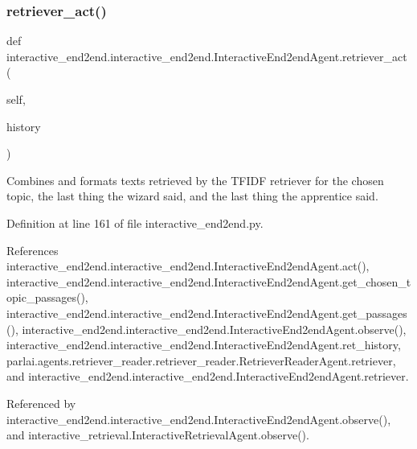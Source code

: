 \subsubsection{\texorpdfstring{retriever\+\_\+act()}{retriever\_act()}}
{\footnotesize\ttfamily def interactive\+\_\+end2end.\+interactive\+\_\+end2end.\+Interactive\+End2end\+Agent.\+retriever\+\_\+act (\begin{DoxyParamCaption}\item[{}]{self,  }\item[{}]{history }\end{DoxyParamCaption})}

\begin{DoxyVerb}Combines and formats texts retrieved by the TFIDF retriever for the
chosen topic, the last thing the wizard said, and the last thing the
apprentice said.
\end{DoxyVerb}
 

Definition at line 161 of file interactive\+\_\+end2end.\+py.



References interactive\+\_\+end2end.\+interactive\+\_\+end2end.\+Interactive\+End2end\+Agent.\+act(), interactive\+\_\+end2end.\+interactive\+\_\+end2end.\+Interactive\+End2end\+Agent.\+get\+\_\+chosen\+\_\+topic\+\_\+passages(), interactive\+\_\+end2end.\+interactive\+\_\+end2end.\+Interactive\+End2end\+Agent.\+get\+\_\+passages(), interactive\+\_\+end2end.\+interactive\+\_\+end2end.\+Interactive\+End2end\+Agent.\+observe(), interactive\+\_\+end2end.\+interactive\+\_\+end2end.\+Interactive\+End2end\+Agent.\+ret\+\_\+history, parlai.\+agents.\+retriever\+\_\+reader.\+retriever\+\_\+reader.\+Retriever\+Reader\+Agent.\+retriever, and interactive\+\_\+end2end.\+interactive\+\_\+end2end.\+Interactive\+End2end\+Agent.\+retriever.



Referenced by interactive\+\_\+end2end.\+interactive\+\_\+end2end.\+Interactive\+End2end\+Agent.\+observe(), and interactive\+\_\+retrieval.\+Interactive\+Retrieval\+Agent.\+observe().

